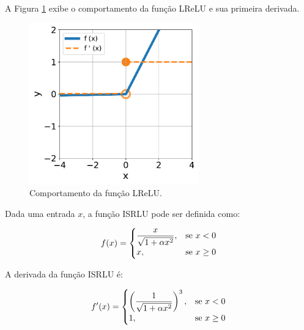 A Figura \ref{fig:ann_lrelu_function} exibe o comportamento da função LReLU \citep{maas2013rectifier} e sua primeira derivada.

\begin{figure}[H]
    \centering
    \includegraphics[width=0.65\textwidth]{figs/ann_lrelu_function.pdf}

    \caption{Comportamento da função LReLU.}
    \label{fig:ann_lrelu_function}
\end{figure}


\linebreak
\newpage


\begin{definition}
    Dada uma entrada $x$, a função ISRLU pode ser definida como:

    \begin{equation}
        f(x) = 
        \begin{cases}
            \dfrac{x}{\sqrt{1 + \alpha x^{2}}}, & \text{se $x < 0$}\\
            x, & \text{se $x \geq 0$}
        \end{cases}
        \vspace{0.2cm}
        \label{eq:ann_isrlu_function}
    \end{equation}

    A derivada da função ISRLU é:

    \begin{equation}
        f'(x) = 
        \begin{cases}
            \left(\dfrac{1}{\sqrt{1 + \alpha x^{2}}}\right)^{3}, & \text{se $x < 0$}\\
            1, & \text{se $x \geq 0$}
        \end{cases}
        \vspace{0.2cm}
        \label{eq:ann_isrlu_function_dy}
    \end{equation}

\end{definition}

